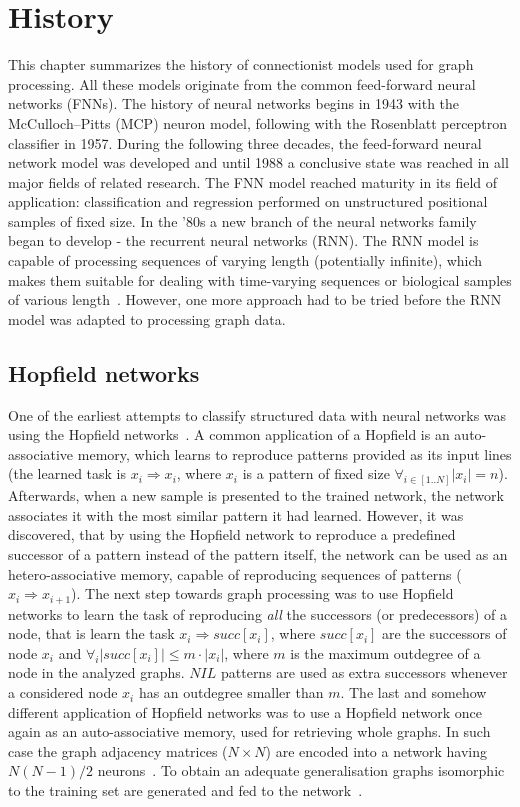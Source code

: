 
\chapter{History}
This chapter summarizes the history of connectionist models used for graph processing. All these models originate from the common feed-forward neural networks (FNNs). The history of neural networks begins in 1943 with the McCulloch–Pitts (MCP) neuron model, following with the Rosenblatt perceptron classifier in 1957. During the following three decades, the feed-forward neural network model was developed and until 1988 a conclusive state was reached in all major fields of related research. The FNN model reached maturity in its field of application: classification and regression performed on unstructured positional samples of fixed size. In the '80s a new branch of the neural networks family began to develop - the recurrent neural networks (RNN). The RNN model is capable of processing sequences of varying length (potentially infinite), which makes them suitable for dealing with time-varying sequences or biological samples of various length~\cite{saha2006prediction}. However, one more approach had to be tried before the RNN model was adapted to processing graph data.

\section{Hopfield networks}
One of the earliest attempts to classify structured data with neural networks was using the Hopfield networks~\cite{goulon2005hopfield}. A common application of a Hopfield is an auto-associative memory, which learns to reproduce patterns provided as its input lines (the learned task is $x_i \Rightarrow x_i$, where $x_i$ is a pattern of fixed size $\forall_{i \in [1..N]} |x_i| = n$). Afterwards, when a new sample is presented to the trained network, the network associates it with the most similar pattern it had learned. However, it was discovered, that by using the Hopfield network to reproduce a predefined successor of a pattern instead of the pattern itself, the network can be used as an hetero-associative memory, capable of reproducing sequences of patterns ($x_i \Rightarrow x_{i+1}$). The next step towards graph processing was to use Hopfield networks to learn the task of reproducing \emph{all} the successors (or predecessors) of a node, that is learn the task $x_i \Rightarrow succ[x_i]$, where $succ[x_i]$ are the successors of node $x_i$ and $\forall_i |succ[x_i]| \leq m \cdot |x_i|$, where $m$ is the maximum outdegree of a node in the analyzed graphs. $NIL$ patterns are used as extra successors whenever a considered node $x_i$ has an outdegree smaller than $m$. The last and somehow different application of Hopfield networks was to use a Hopfield network once again as an auto-associative memory, used for retrieving whole graphs. In such case the graph adjacency matrices ($N \times N$) are encoded into a network having $N(N - 1)/2$ neurons~\cite{goulon2005hopfield}. To obtain an adequate generalisation graphs isomorphic to the training set are generated and fed to the network~\cite{kree1988recognition}.

